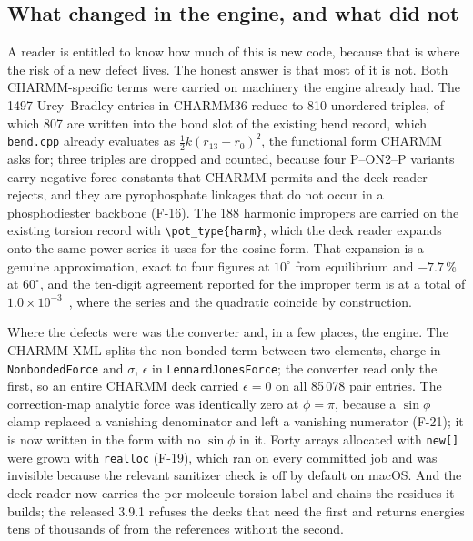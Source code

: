 \subsection{What changed in the engine, and what did not}
\label{sec:baseline}

A reader is entitled to know how much of this is new code, because that is
where the risk of a new defect lives. The honest answer is that most of it is
not. Both CHARMM-specific terms were carried on machinery the engine already
had. The 1497 Urey--Bradley entries in CHARMM36 reduce to 810 unordered
triples, of which 807 are written into the bond slot of the existing bend
record, which \texttt{bend.cpp} already evaluates as
$\tfrac{1}{2}k(r_{13}-r_0)^2$, the functional form CHARMM asks for; three
triples are dropped and counted, because four P--ON2--P variants carry negative
force constants that CHARMM permits and the deck reader rejects, and they are
pyrophosphate linkages that do not occur in a phosphodiester backbone (F-16).
The 188 harmonic impropers are carried on the existing torsion record with
\verb|\pot_type{harm}|, which the deck reader expands onto the same power series
it uses for the cosine form. That expansion is a genuine approximation, exact
to four figures at $10^{\circ}$ from equilibrium and $-7.7$\,\% at
$60^{\circ}$, and the ten-digit agreement reported for the improper term is at
a total of $1.0\times10^{-3}$~\kcal{}, where the series and the quadratic
coincide by construction.

Where the defects were was the converter and, in a few places, the engine. The
CHARMM XML splits the non-bonded term between two elements, charge in
\texttt{NonbondedForce} and $\sigma$, $\epsilon$ in
\texttt{LennardJonesForce}; the converter read only the first, so an entire
CHARMM deck carried $\epsilon = 0$ on all 85\,078 pair entries. The
correction-map analytic force was identically zero at $\phi = \pi$, because a
$\sin\phi$ clamp replaced a vanishing denominator and left a vanishing
numerator (F-21); it is now written in the form with no $\sin\phi$ in it. Forty
arrays allocated with \verb|new[]| were grown with \verb|realloc| (F-19), which
ran on every committed job and was invisible because the relevant sanitizer
check is off by default on macOS. And the deck reader now carries the
per-molecule torsion label and chains the residues it builds; the released
3.9.1 refuses the decks that need the first and returns energies tens of
thousands of \kcal{} from the references without the second.

